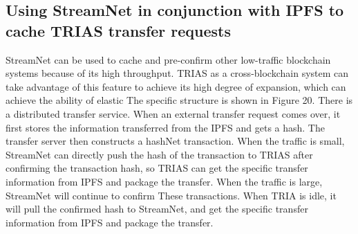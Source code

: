 \documentclass{article}
\begin{document}
\subsection{Using StreamNet in conjunction with IPFS to cache TRIAS transfer requests}
StreamNet can be used to cache and pre-confirm other low-traffic blockchain systems because of its high throughput. TRIAS as a cross-blockchain system can take advantage of this feature to achieve its high degree of expansion, which can achieve the ability of elastic The specific structure is shown in Figure 20. There is a distributed transfer service. When an external transfer request comes over, it first stores the information transferred from the IPFS and gets a hash. The transfer server then constructs a hashNet transaction. When the traffic is small, StreamNet can directly push the hash of the transaction to TRIAS after confirming the transaction hash, so TRIAS can get the specific transfer information from IPFS and package the transfer. When the traffic is large, StreamNet will continue to confirm These transactions. When TRIA is idle, it will pull the confirmed hash to StreamNet, and get the specific transfer information from IPFS and package the transfer.
\end{document}
